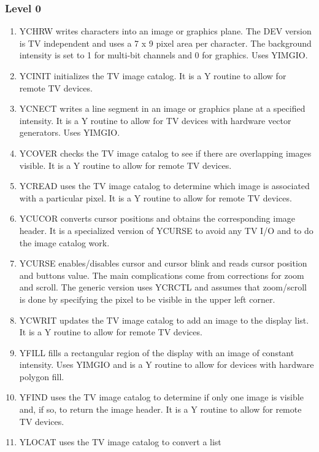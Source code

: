 \subsubsection{Level 0}
\begin{enumerate} %
\item YCHRW writes characters into an image or graphics
plane.  The DEV
version is TV independent and uses a 7 x 9 pixel area per character.
The background intensity is set to 1 for multi-bit channels and 0 for
graphics.  Uses YIMGIO.
\item YCINIT initializes the TV image catalog.  It is a
Y routine to allow for remote TV devices.
\item YCNECT writes a line segment in an image or
graphics plane at a specified intensity.  It is a Y routine to allow for
TV devices with hardware vector generators.  Uses YIMGIO.
\item YCOVER checks the TV image catalog to see if
there are overlapping images visible.  It is a Y routine to allow for
remote TV devices.
\item YCREAD uses the TV image catalog to determine which
image is associated with a particular pixel.  It is a Y routine to allow
for remote TV devices.
\item YCUCOR converts cursor positions and obtains the
corresponding image
header.  It is a specialized version of YCURSE to avoid any TV I/O and
to do the image catalog work.
\item YCURSE enables/disables cursor and cursor blink and
reads cursor
position and buttons value.  The main complications come from
corrections for zoom and scroll.  The generic version uses YCRCTL and
assumes that zoom/scroll is done by specifying the pixel to be visible
in the upper left corner.
\item YCWRIT updates the TV image catalog to add an image
to the display
list.  It is a Y routine to allow for remote TV devices.
\item YFILL fills a rectangular region of the display with
an image of
constant intensity.  Uses YIMGIO and is a Y routine to allow for
devices with hardware polygon fill.
\item YFIND uses the TV image catalog to determine if only
one image is
visible and, if so, to return the image header.  It is a Y routine to
allow for remote TV devices.
\item YLOCAT uses the TV image catalog to convert a list

\end{enumerate}
